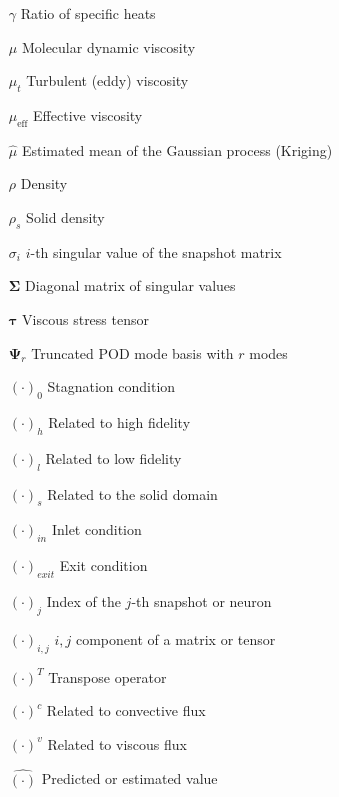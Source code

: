 \begin{itemize}
\item[$\gamma$] Ratio of specific heats
\item[$\mu$] Molecular dynamic viscosity
\item[$\mu_t$] Turbulent (eddy) viscosity
\item[$\mu_{\text{eff}}$] Effective viscosity
\item[$\hat{\mu}$] Estimated mean of the Gaussian process (Kriging)
\item[$\rho$] Density
\item[$\rho_s$] Solid density
\item[$\sigma_i$] $i$-th singular value of the snapshot matrix
\item[$\mathbf{\Sigma}$] Diagonal matrix of singular values
\item[$\boldsymbol{\tau}$] Viscous stress tensor
\item[$\mathbf{\Psi}_r$] Truncated POD mode basis with $r$ modes
\end{itemize}

\begin{itemize}
\item[$(\cdot)_0$] Stagnation condition
\item[$(\cdot)_h$] Related to high fidelity
\item[$(\cdot)_l$] Related to low fidelity
\item[$(\cdot)_s$] Related to the solid domain
\item[$(\cdot)_{in}$] Inlet condition
\item[$(\cdot)_{exit}$] Exit condition
\item[$(\cdot)_{j}$] Index of the $j$-th snapshot or neuron
\item[$(\cdot)_{i,j}$] $i,j$ component of a matrix or tensor
\item[$(\cdot)^T$] Transpose operator
\item[$(\cdot)^c$] Related to convective flux
\item[$(\cdot)^v$] Related to viscous flux
\item[$\hat{(\cdot)}$] Predicted or estimated value
\end{itemize}